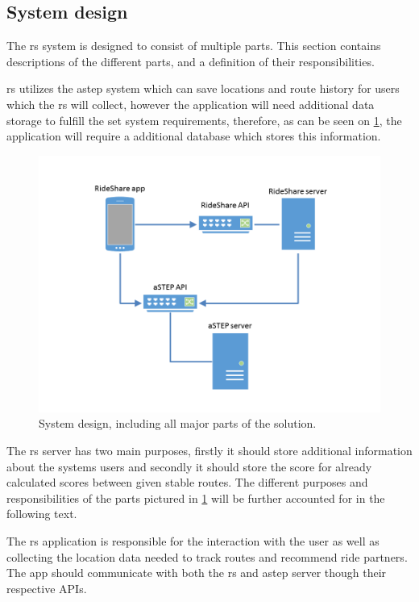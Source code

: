 \subsection{System design}
The \gls{rs} system is designed to consist of multiple parts.
This section contains descriptions of the different parts, and a definition of their responsibilities.

\gls{rs} utilizes the \gls{astep} system which can save locations and route history for users which the \gls{rs} will collect, however the application will need additional data storage to fulfill the set system requirements, therefore, as can be seen on \ref{fig:s2systemdesign}, the application will require a additional database which stores this information.
\begin{figure}[!h]
	\centering
	\includegraphics[width=\textwidth]{figures/SystemDesign.png}
	\caption{System design, including all major parts of the solution.}
	\label{fig:s2systemdesign}
\end{figure}
The \gls{rs} server has two main purposes, firstly it should store additional information about the systems users and secondly it should store the score for already calculated scores between given stable routes.
The different purposes and responsibilities of the parts pictured in \ref{fig:s2systemdesign} will be further accounted for in the following text.

The \gls{rs} application is responsible for the interaction with the user as well as collecting the location data needed to track routes and recommend ride partners.
The app should communicate with both the \gls{rs} and \gls{astep} server though their respective APIs.

